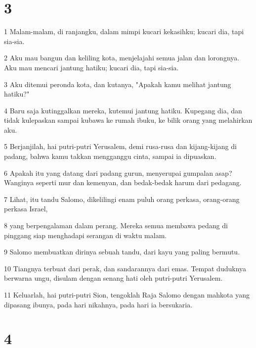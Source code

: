\chapter{3}

\par 1 Malam-malam, di ranjangku, dalam mimpi kucari kekasihku; kucari dia, tapi sia-sia.
\par 2 Aku mau bangun dan keliling kota, menjelajahi semua jalan dan lorongnya. Aku mau mencari jantung hatiku; kucari dia, tapi sia-sia.
\par 3 Aku ditemui peronda kota, dan kutanya, "Apakah kamu melihat jantung hatiku?"
\par 4 Baru saja kutinggalkan mereka, kutemui jantung hatiku. Kupegang dia, dan tidak kulepaskan sampai kubawa ke rumah ibuku, ke bilik orang yang melahirkan aku.
\par 5 Berjanjilah, hai putri-putri Yerusalem, demi rusa-rusa dan kijang-kijang di padang, bahwa kamu takkan mengganggu cinta, sampai ia dipuaskan.
\par 6 Apakah itu yang datang dari padang gurun, menyerupai gumpalan asap? Wanginya seperti mur dan kemenyan, dan bedak-bedak harum dari pedagang.
\par 7 Lihat, itu tandu Salomo, dikelilingi enam puluh orang perkasa, orang-orang perkasa Israel,
\par 8 yang berpengalaman dalam perang. Mereka semua membawa pedang di pinggang siap menghadapi serangan di waktu malam.
\par 9 Salomo membuatkan dirinya sebuah tandu, dari kayu yang paling bermutu.
\par 10 Tiangnya terbuat dari perak, dan sandarannya dari emas. Tempat duduknya berwarna ungu, disulam dengan senang hati oleh putri-putri Yerusalem.
\par 11 Keluarlah, hai putri-putri Sion, tengoklah Raja Salomo dengan mahkota yang dipasang ibunya, pada hari nikahnya, pada hari ia bersukaria.

\chapter{4}

